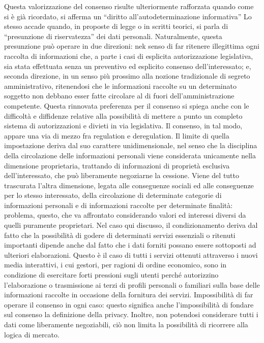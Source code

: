 Questa valorizzazione del consenso risulte ulteriormente rafforzata quando come si è già ricordato, si afferma un “diritto all’autodeterminazione informativa” Lo stesso accade quando, in proposte di legge o in scritti teorici, si parla di “presunzione di riservatezza” dei dati personali. Naturalmente, questa presunzione può operare in due direzioni: nek senso di far ritenere illegittima ogni raccolta di informazioni che, a parte i casi di esplicita autorizzazione legislativa, sia stata effettuata senza un preventivo ed esplicito consenso dell’interessato; e, seconda direzione, in un senso più prossimo alla nozione tradizionale di segreto amministrativo, ritenendosi che le informazioni raccolte su un determinato soggetto non debbano esser fatte circolare al di fuori dell’amministrazione competente.
Questa rinnovata preferenza per il consenso si spiega anche con le difficoltà e diffidenze relative alla possibilità di mettere a punto un completo sistema di autorizzazioni e divieti in via legislativa. Il consenso, in tal modo, appare una via di mezzo fra regulation e deregulation. Il limite di quella impostazione deriva dal suo carattere unidimensionale, nel senso che la disciplina della circolazione delle informazioni personali viene considerata unicamente nella dimensione proprietaria, trattando di informazioni di proprietà esclusiva dell’interessato, che può liberamente negoziarne la cessione. Viene del tutto trascurata l’altra dimensione, legata alle conseguenze sociali ed alle conseguenze per lo stesso interessato, della circolazione di determinate categorie di informazioni personali e di informazioni raccolte per determinate finalità: problema, questo, che va affrontato considerando valori ed interessi diversi da quelli puramente proprietari. 
Nel caso qui discusso, il condizionamento deriva dal fatto che la possibilità di godere di determinati servizi essenziali o ritenuti importanti dipende anche dal fatto che i dati forniti possano essere sottoposti ad ulteriori elaborazioni. Questo è il caso di tutti i servizi ottenuti attraverso i nuovi media interattivi, i cui gestori, per ragioni di ordine economico, sono in condizione di esercitare forti pressioni sugli utenti perché autorizzino l’elaborazione o trasmissione ai terzi di profili personali o familiari sulla base delle informazioni raccolte in occasione della fornitura dei servizi. Impossibilità di far operare il consenso in ogni caso: questo significa anche l’impossibilità di fondare sul consenso la definizione della privacy. Inoltre, non potendosi considerare tutti i dati come liberamente negoziabili, ciò non limita la possibilità di ricorrere alla logica di mercato.
